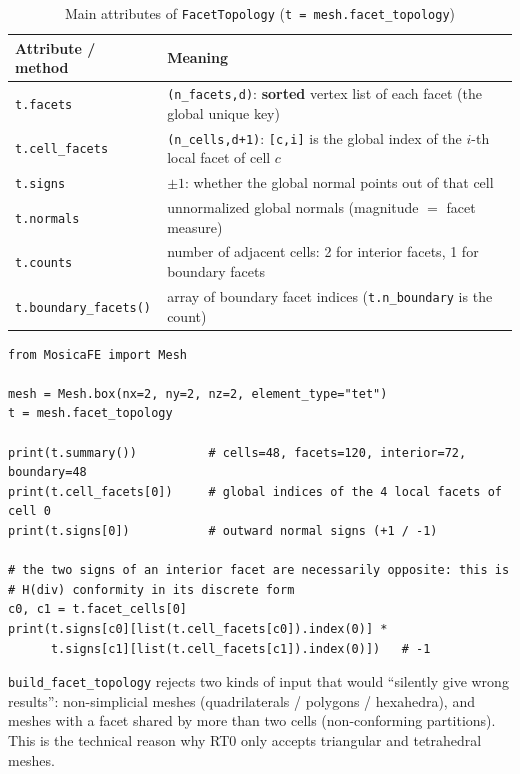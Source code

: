 \documentclass[11pt,oneside]{book}
\theoremstyle{definition}
\theoremstyle{plain}
\newenvironment{important}{%
  \begin{tcolorbox}[colback=blue!5,colframe=blue!45,title=Key Point,fonttitle=\bfseries]%
}{%
  \end{tcolorbox}%
}
\newcommand{\code}[1]{\texttt{#1}}
\begin{document}
\begin{table}[htbp]
\centering
\caption{Main attributes of \code{FacetTopology} (\code{t = mesh.facet\_topology})}
\label{tab:facettopo}
\begin{lrbox}{\guideTableBox}
\begin{tabular}{@{}L{4.4cm}L{10.0cm}@{}}
\toprule
Attribute / method & Meaning \\
\midrule
\code{t.facets} & \code{(n\_\allowbreak facets,\allowbreak  d)}: \textbf{sorted} vertex list of each facet (the global unique key) \\
\code{t.cell\_\allowbreak facets} & \code{(n\_\allowbreak cells,\allowbreak  d+1)}: \code{[c,\allowbreak i]} is the global index of the $i$-th local facet of cell $c$ \\
\code{t.signs} & $\pm1$: whether the global normal points out of that cell \\
\code{t.normals} & unnormalized global normals (magnitude $=$ facet measure) \\
\code{t.counts} & number of adjacent cells: 2 for interior facets, 1 for boundary facets \\
\code{t.boundary\_\allowbreak facets()} & array of boundary facet indices (\code{t.n\_\allowbreak boundary} is the count) \\
\bottomrule
\end{tabular}
\end{lrbox}%
\ifdim\wd\guideTableBox>\linewidth
  \resizebox{\linewidth}{!}{\usebox{\guideTableBox}}%
\else\usebox{\guideTableBox}\fi
\end{table}

\begin{lstlisting}[language=MosicaFE,caption={Facet topology and orientation}]
from MosicaFE import Mesh

mesh = Mesh.box(nx=2, ny=2, nz=2, element_type="tet")
t = mesh.facet_topology

print(t.summary())          # cells=48, facets=120, interior=72, boundary=48
print(t.cell_facets[0])     # global indices of the 4 local facets of cell 0
print(t.signs[0])           # outward normal signs (+1 / -1)

# the two signs of an interior facet are necessarily opposite: this is
# H(div) conformity in its discrete form
c0, c1 = t.facet_cells[0]
print(t.signs[c0][list(t.cell_facets[c0]).index(0)] *
      t.signs[c1][list(t.cell_facets[c1]).index(0)])   # -1
\end{lstlisting}

\begin{important}
\code{build\_\allowbreak facet\_\allowbreak topology} rejects two kinds of input that would ``silently give
wrong results'': non-simplicial meshes (quadrilaterals / polygons / hexahedra), and
meshes with a facet shared by more than two cells (non-conforming partitions). This
is the technical reason why RT0 only accepts triangular and tetrahedral meshes.
\end{important}
\end{document}

